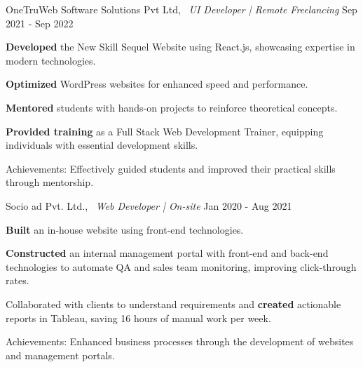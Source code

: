 \begin{cventries2}
  \cventrynew
    {OneTruWeb Software Solutions Pvt Ltd, \ \textnormal{\textit{UI Developer | Remote Freelancing}}} %
    {Sep 2021 - Sep 2022} %
    {
      \begin{cvitems}
        \item {{\bf Developed} the New Skill Sequel Website using React.js, showcasing expertise in modern technologies.}
        \item {{\bf Optimized} WordPress websites for enhanced speed and performance.}
        \item {{\bf Mentored} students with hands-on projects to reinforce theoretical concepts.}
        \item {{\bf Provided training} as a Full Stack Web Development Trainer, equipping individuals with essential development skills.}
        \item {Achievements: Effectively guided students and improved their practical skills through mentorship.}
      \end{cvitems}
    }

  \cventrynew
    {Socio ad Pvt. Ltd., \ \textnormal{\textit{Web Developer | On-site}}} %
    {Jan 2020 - Aug 2021} %
    {
      \begin{cvitems}
        \item {{\bf Built} an in-house website using front-end technologies.}
        \item {{\bf Constructed} an internal management portal with front-end and back-end technologies to automate QA and sales team monitoring, improving click-through rates.}
        \item {Collaborated with clients to understand requirements and {\bf created} actionable reports in Tableau, saving 16 hours of manual work per week.}
        \item {Achievements: Enhanced business processes through the development of websites and management portals.}
      \end{cvitems}
    }

\end{cventries2}
